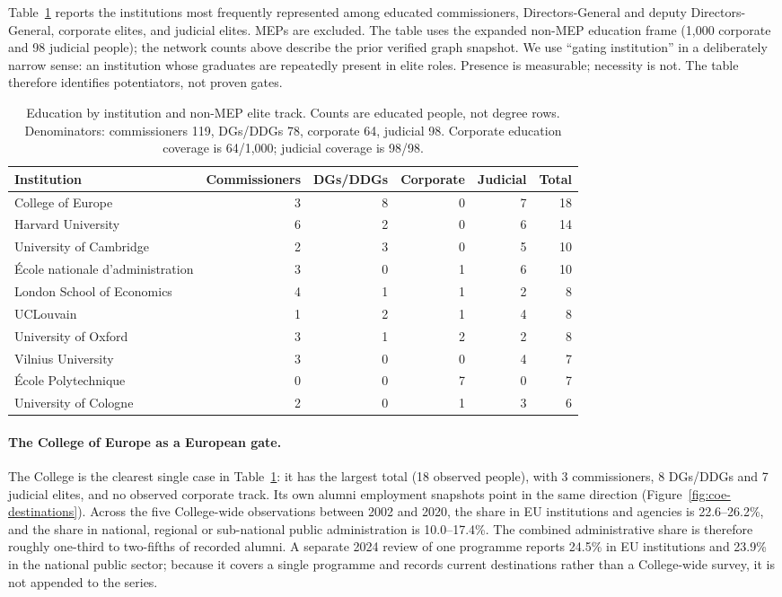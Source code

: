 \documentclass[11pt,a4paper]{article}
\begin{document}
Table~\ref{tab:schools} reports the institutions most frequently represented among educated commissioners, Directors-General and deputy Directors-General, corporate elites, and judicial elites. MEPs are excluded. The table uses the expanded non-MEP education frame (1{,}000 corporate and 98 judicial people); the network counts above describe the prior verified graph snapshot. We use ``gating institution'' in a deliberately narrow sense: an institution whose graduates are repeatedly present in elite roles. Presence is measurable; necessity is not. The table therefore identifies potentiators, not proven gates.

\begin{table}[htbp]
\centering
\small
\begin{tabular}{lrrrrr}
\toprule
Institution & Commissioners & DGs/DDGs & Corporate & Judicial & Total \\
\midrule
College of Europe & 3 & 8 & 0 & 7 & 18 \\
Harvard University & 6 & 2 & 0 & 6 & 14 \\
University of Cambridge & 2 & 3 & 0 & 5 & 10 \\
\'Ecole nationale d'administration & 3 & 0 & 1 & 6 & 10 \\
London School of Economics & 4 & 1 & 1 & 2 & 8 \\
UCLouvain & 1 & 2 & 1 & 4 & 8 \\
University of Oxford & 3 & 1 & 2 & 2 & 8 \\
Vilnius University & 3 & 0 & 0 & 4 & 7 \\
\'Ecole Polytechnique & 0 & 0 & 7 & 0 & 7 \\
University of Cologne & 2 & 0 & 1 & 3 & 6 \\
\bottomrule
\end{tabular}
\caption{Education by institution and non-MEP elite track. Counts are educated people, not degree rows. Denominators: commissioners 119, DGs/DDGs 78, corporate 64, judicial 98. Corporate education coverage is 64/1{,}000; judicial coverage is 98/98.}
\label{tab:schools}
\end{table}

\paragraph{The College of Europe as a European gate.}
The College is the clearest single case in Table~\ref{tab:schools}: it has the largest total (18 observed people), with 3 commissioners, 8 DGs/DDGs and 7 judicial elites, and no observed corporate track. Its own alumni employment snapshots point in the same direction (Figure~\ref{fig:coe-destinations}). Across the five College-wide observations between 2002 and 2020, the share in EU institutions and agencies is 22.6--26.2\%, and the share in national, regional or sub-national public administration is 10.0--17.4\%. The combined administrative share is therefore roughly one-third to two-fifths of recorded alumni. A separate 2024 review of one programme reports 24.5\% in EU institutions and 23.9\% in the national public sector; because it covers a single programme and records current destinations rather than a College-wide survey, it is not appended to the series.
\end{document}
